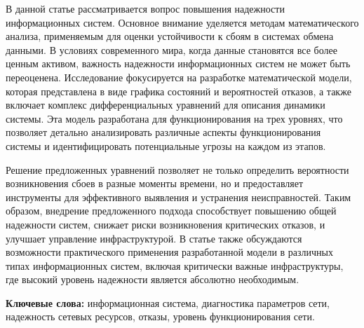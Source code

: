 В данной статье рассматривается вопрос повышения надежности
информационных систем. Основное внимание уделяется методам
математического анализа, применяемым для оценки устойчивости к сбоям в
системах обмена данными. В условиях современного мира, когда данные
становятся все более ценным активом, важность надежности информационных
систем не может быть переоценена. Исследование фокусируется на
разработке математической модели, которая представлена в виде графика
состояний и вероятностей отказов, а также включает комплекс
дифференциальных уравнений для описания динамики системы. Эта модель
разработана для функционирования на трех уровнях, что позволяет детально
анализировать различные аспекты функционирования системы и
идентифицировать потенциальные угрозы на каждом из этапов.

Решение предложенных уравнений позволяет не только определить
вероятности возникновения сбоев в разные моменты времени, но и
предоставляет инструменты для эффективного выявления и устранения
неисправностей. Таким образом, внедрение предложенного подхода
способствует повышению общей надежности систем, снижает риски
возникновения критических отказов, и улучшает управление
инфраструктурой. В статье также обсуждаются возможности практического
применения разработанной модели в различных типах информационных систем,
включая критически важные инфраструктуры, где высокий уровень надежности
является абсолютно необходимым.

{\bfseries Ключевые слова:} информационная система, диагностика параметров
сети, надежность сетевых ресурсов, отказы, уровень функционирования
сети.

